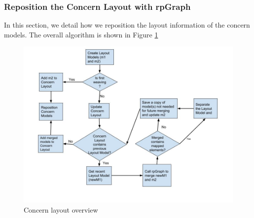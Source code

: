 \subsubsection{Reposition the Concern Layout with rpGraph}
 In this section, we detail how we reposition the layout information of the concern models. The overall algorithm is shown in Figure \ref{concern layout overview}
  \begin{figure}
	\centering
    \includegraphics[width=1\linewidth]{concernOverview.jpg}
    \caption{Concern layout overview}
    \label{concern layout overview}
\end{figure}

